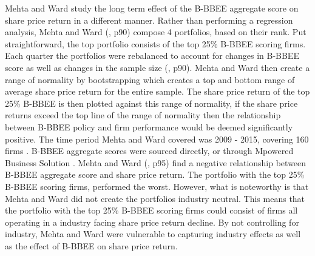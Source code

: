 Mehta and Ward study the long term effect of the B-BBEE aggregate score on share price return in a different manner. Rather than performing a regression analysis, Mehta and Ward (\citeyear{N27}, p90) compose 4 portfolios, based on their rank. Put straightforward, the top portfolio consists of the top 25\% B-BBEE scoring firms. Each quarter the portfolios were rebalanced to account for changes in B-BBEE score as well as changes in the sample size (\citeyear{N27}, p90). Mehta and Ward then create a range of normality by bootstrapping which creates a top and bottom range of average share price return for the entire sample. The share price return of the top 25\% B-BBEE is then plotted against this range of normality, if the share price returns exceed the top line of the range of normality then the relationship between B-BBEE policy and firm performance would be deemed significantly positive. The time period Mehta and Ward covered was 2009 - 2015, covering 160 firms \cite[p89, p94]{N27}. B-BBEE aggregate scores were sourced directly, or through Mpowered Business Solution \cite[p89]{N27}. Mehta and Ward (\citeyear{N27}, p95) find a negative relationship between B-BBEE aggregate score and share price return. The portfolio with the top 25\% B-BBEE scoring firms, performed the worst. However, what is noteworthy is that Mehta and Ward did not create the portfolios industry neutral. This means that the portfolio with the top 25\% B-BBEE scoring firms could consist of firms all operating in a industry facing share price return decline. By not controlling for industry, Mehta and Ward were vulnerable to capturing industry effects as well as the effect of B-BBEE on share price return.

